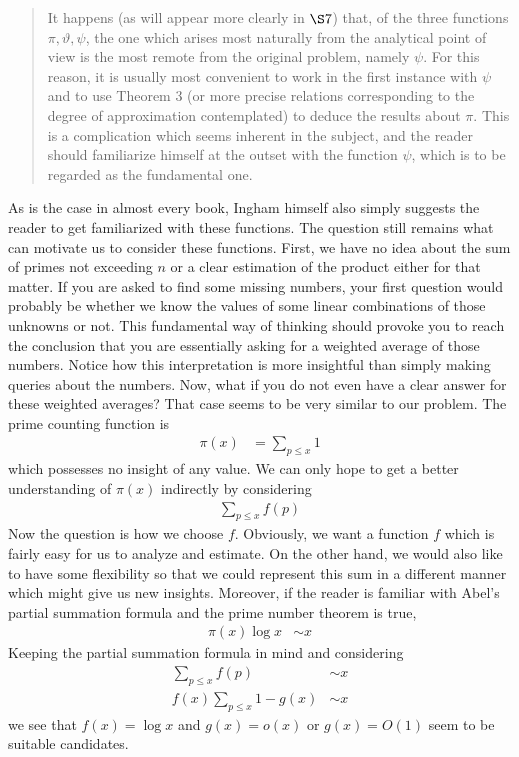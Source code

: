 \documentclass[elemannt.tex]{subfile}
\begin{document}
		\begin{quote}
			It happens (as will appear more clearly in $\S7$) that, of the three functions $\pi,\vartheta,\psi$, the one which arises most naturally from the analytical point of view is the most remote from the original problem, namely $\psi$. For this reason, it is usually most convenient to work in the first instance with $\psi$ and to use Theorem 3 (or more precise relations corresponding to the degree of approximation contemplated) to deduce the results about $\pi$. This is a complication which seems inherent in the subject, and the reader should familiarize himself at the outset with the function $\psi$, which is to be regarded as the fundamental one.
		\end{quote}
	As is the case in almost every book, Ingham himself also simply suggests the reader to get familiarized with these functions. The question still remains what can motivate us to consider these functions. First, we have no idea about the sum of primes not exceeding $n$ or a clear estimation of the product either for that matter. If you are asked to find some missing numbers, your first question would probably be whether we know the values of some linear combinations of those unknowns or not. This fundamental way of thinking should provoke you to reach the conclusion that you are essentially asking for a weighted average of those numbers. Notice how this interpretation is more insightful than simply making queries about the numbers. Now, what if you do not even have a clear answer for these weighted averages? That case seems to be very similar to our problem. The prime counting function is
		\begin{align*}
			\pi(x)
				& = \sum_{p\leq x}1
		\end{align*}
	which possesses no insight of any value. We can only hope to get a better understanding of $\pi(x)$ indirectly by considering
		\begin{align*}
			\sum_{p\leq x}f(p)
		\end{align*}
	Now the question is how we choose $f$. Obviously, we want a function $f$ which is fairly easy for us to analyze and estimate. On the other hand, we would also like to have some flexibility so that we could represent this sum in a different manner which might give us new insights. Moreover, if the reader is familiar with Abel's partial summation formula and the prime number theorem is true,
		\begin{align*}
			\pi(x)\log{x}
				& \sim x
		\end{align*}
	Keeping the partial summation formula in mind and considering
		\begin{align*}
			\sum_{p\leq x}f(p)
				& \sim x\\
			f(x)\sum_{p\leq x}1-g(x)
				& \sim x
		\end{align*}
	we see that $f(x)=\log{x}$ and $g(x)=o(x)$ or $g(x)=O(1)$ seem to be suitable candidates.
	
\end{document}
